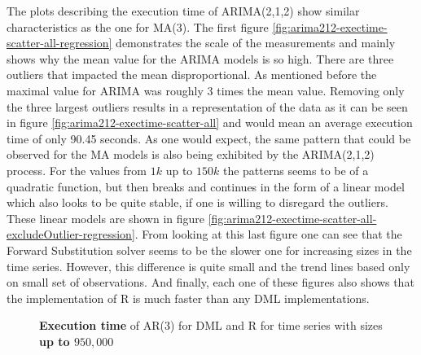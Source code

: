 The plots describing the execution time of \acs{ARIMA}(2,1,2) show similar characteristics as the one for \acl{MA}(3). The first figure \ref{fig:arima212-exectime-scatter-all-regression} demonstrates the scale of the measurements and mainly shows why the mean value for the \acs{ARIMA} models is so high. There are three outliers that impacted the mean disproportional. As mentioned before the maximal value for \acs{ARIMA} was roughly 3 times the mean value. Removing only the three largest outliers results in a representation of the data as it can be seen in figure \ref{fig:arima212-exectime-scatter-all} and would mean an average execution time of only 90.45 seconds. As one would expect, the same pattern that could be observed for the \acl{MA} models is also being exhibited by the \acs{ARIMA}(2,1,2) process. For the values from $1k$ up to $150k$ the patterns seems to be of a quadratic function, but then breaks and continues in the form of a linear model which also looks to be quite stable, if one is willing to disregard the outliers. These linear models are shown in figure \ref{fig:arima212-exectime-scatter-all-excludeOutlier-regression}. From looking at this last figure one can see that the Forward Substitution solver seems to be the slower one for increasing sizes in the time series. However, this difference is quite small and the trend lines based only on small set of observations. And finally, each one of these figures also shows that the implementation of R is much faster than any DML implementations.

\begin{figure}[ht]
	\centering
	\caption{\textbf{Execution time} of AR(3) for DML and R for time series with sizes \textbf{up to $950,000$} }
    \label{fig:ar3-exectime-scatter-all-regression}
\end{figure}

